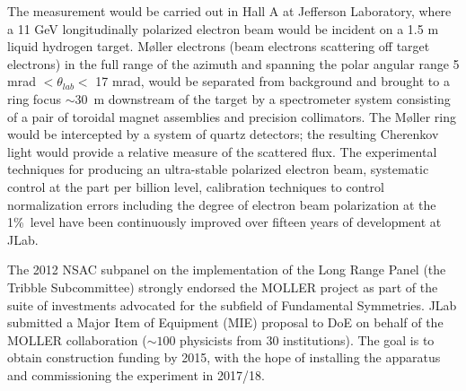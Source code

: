 The measurement would be carried out in Hall A at Jefferson Laboratory, where a 11 GeV longitudinally polarized electron beam would be incident on a 1.5 m liquid hydrogen target. M\o ller electrons (beam electrons scattering off target electrons) in the full range of the azimuth and spanning the polar angular range 5 mrad $<\theta_{lab}<$ 17 mrad, would be separated from background and brought to a ring focus $\sim 30$~m downstream of the target by a spectrometer system consisting of a pair of toroidal magnet assemblies and precision collimators. 
The M\o ller ring would be intercepted by a system of quartz detectors; the resulting Cherenkov light would provide a relative measure of the scattered flux. The experimental techniques for producing an ultra-stable polarized electron beam, systematic
control at the part per billion level, calibration techniques to control normalization errors including the degree of electron 
beam polarization at the 1\%\ level have been continuously improved over fifteen years of development at JLab.


The 2012 NSAC subpanel on the implementation of the Long Range Panel (the Tribble 
 Subcommittee) strongly endorsed the MOLLER project as part of the suite of investments advocated for 
 the subfield of Fundamental Symmetries.
JLab submitted a Major Item of Equipment (MIE) proposal
to DoE on behalf of the MOLLER collaboration ($\sim 100$ physicists from 30 institutions).
The goal is to obtain construction funding by 2015, with 
the hope of installing the apparatus and commissioning the experiment in 2017/18. 


